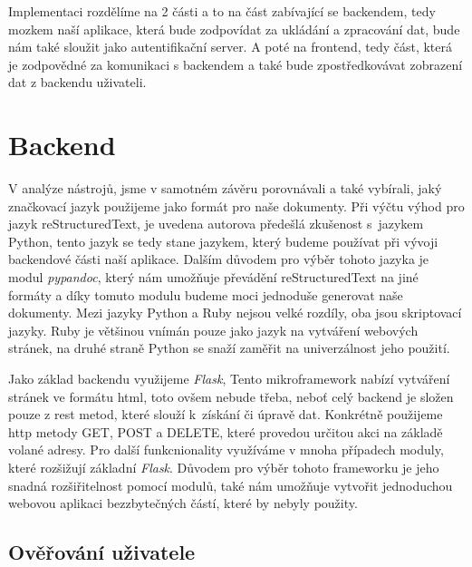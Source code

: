 Implementaci rozdělíme na 2 části a to na část zabívající se backendem, tedy mozkem naší aplikace, která bude zodpovídat
za ukládání a zpracování dat, bude nám také sloužit jako autentifikační server. A poté na frontend, tedy část, která
je zodpovědné za komunikaci s backendem a také bude zpostředkovávat zobrazení dat z backendu uživateli.

\section{Backend}

V analýze nástrojů, jsme v samotném závěru porovnávali a také vybírali, jaký značkovací jazyk použijeme jako formát pro naše dokumenty.
Při výčtu výhod pro jazyk reStructuredText, je uvedena autorova předešlá zkušenost s~jazykem Python, tento jazyk se tedy stane jazykem,
který budeme používat při vývoji backendové části naší aplikace.
Dalším důvodem pro výběr tohoto jazyka je modul \textit{pypandoc},
který nám umožňuje převádění reStructuredText na jiné formáty a díky tomuto modulu budeme moci jednoduše generovat naše dokumenty. Mezi jazyky
Python a Ruby nejsou velké rozdíly, oba jsou skriptovací jazyky. Ruby je většinou vnímán pouze jako jazyk na vytváření webových stránek, na druhé straně
Python se snaží zaměřit na univerzálnost jeho použití. \cite{pythonRubyFight}

Jako základ backendu využijeme \textit{Flask},  \cite{flaskDoc}
Tento mikroframework nabízí vytváření stránek ve formátu \gls{html}, toto ovšem \mbox{nebude} třeba, \mbox{neboť} celý backend je složen pouze z \gls{rest} metod,
které slouží k~získání či úpravě dat. Konkrétně použijeme \gls{http} metody GET, POST a DELETE, které provedou určitou akci na základě volané adresy.
Pro další funkcnionality využíváme v mnoha případech moduly, které rozšižují základní \textit{Flask}. Důvodem pro výběr tohoto frameworku
je jeho snadná rozšiřitelnost pomocí modulů, také nám umožňuje vytvořit jednoduchou webovou aplikaci bez\linebreak zbytečných částí, které by nebyly použity.

\subsection{Ověřování uživatele}

